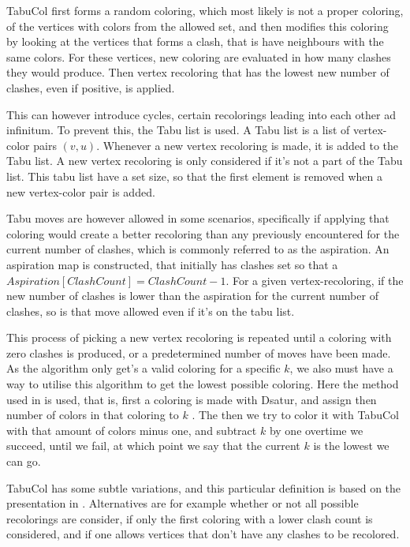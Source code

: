 \documentclass{amsart}
\begin{document}
TabuCol first forms a random coloring, which most likely is not a proper
coloring, of the vertices with colors from the allowed set, and then modifies
this coloring by looking at the vertices that forms a clash, that is have
neighbours with the same colors. For these vertices, new coloring are evaluated
in how many clashes they would produce. Then vertex recoloring that has the
lowest new number of clashes, even if positive, is applied.

This can however introduce cycles, certain recolorings leading into each other
ad infinitum. To prevent this, the Tabu list is used. A Tabu list is a list 
of vertex-color pairs $(v,u)$. Whenever a new vertex recoloring is made, it is
added to the Tabu list. A new vertex recoloring is only considered if it's not a
part of the Tabu list. This tabu list have a set size, so that the first element
is removed when a new vertex-color pair is added.

Tabu moves are however allowed in some scenarios, specifically if applying that
coloring would create a better recoloring than any previously encountered for
the current number of clashes, which is commonly referred to as the aspiration.
An aspiration map is constructed, that initially has clashes set so that a
$Aspiration[ClashCount] = ClashCount-1$. For a given vertex-recoloring, if the
new number of clashes is lower than the aspiration for the current number of
clashes, so is that move allowed even if it's on the tabu list.

This process of picking a new vertex recoloring is repeated until a coloring
with zero clashes is produced, or a predetermined number of moves have been
made. As the algorithm only get's a valid coloring for a specific $k$, we also
must have a way to utilise this algorithm to get the lowest possible coloring.
Here the method used in \cite{Constructive} is used, that is, first a coloring
is made with Dsatur, and assign then number of colors in that coloring to $k$ .
The then we try to color it with TabuCol with that amount of colors minus one,
and subtract $k$ by one overtime we succeed, until we fail, at which point we
say that the current $k$ is the lowest we can go.

TabuCol has some subtle variations, and this particular definition is based on
the presentation in \cite{1990}. Alternatives are for example whether or not all
possible recolorings are consider, if only the first coloring with a lower clash
count is considered, and if one allows vertices that don't have any clashes to
be recolored.
\end{document}
